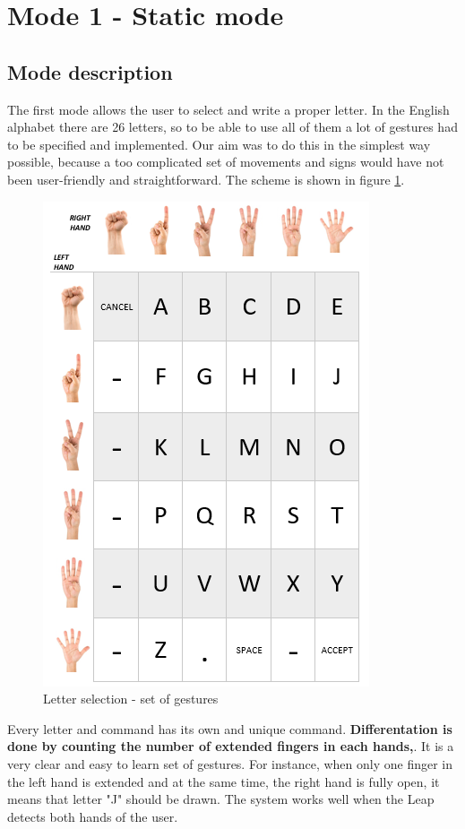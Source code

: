 \section{Mode 1 - Static mode}
\subsection {Mode description}
The first mode allows the user to select and write a proper letter. In the English alphabet there are 26 letters, so to be able to use all of them a lot of gestures had to be specified and implemented. Our aim was to do this in the simplest way possible, because a too complicated set of movements and signs would have not been user-friendly and straightforward. The scheme is shown in figure \ref{fig:letters}.

\begin{figure}[H]
	\includegraphics{static_gestures}
	\centering
	\caption{Letter selection - set of gestures}
	\label{fig:letters}
\end{figure}

Every letter and command has its own and unique command. \textbf{Differentation is done by counting the number of extended fingers in each hands,}. It is a very clear and easy to learn set of gestures. For instance, when only one finger in the left hand is extended and at the same time, the right hand is fully open, it means that letter "J" should be drawn. The system works well when the Leap detects both hands of the user.\\

